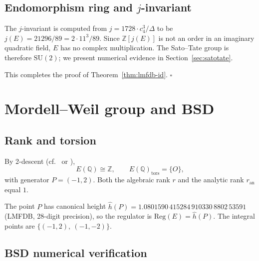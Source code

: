 \documentclass[11pt,a4paper]{article}
\theoremstyle{plain}
\theoremstyle{definition}
\newcommand{\Q}{\mathbb{Q}}
\newcommand{\Z}{\mathbb{Z}}
\newcommand{\Reg}{\mathrm{Reg}}
\begin{document}
\subsection{Endomorphism ring and $j$-invariant}

The $j$-invariant is computed from
$j = 1728 \cdot c_4^3 / \Delta$ to be
$j(E) = 21296 / 89 = 2 \cdot 11^3 / 89$.
Since $\mathbb{Z}[j(E)]$ is not an order in an imaginary quadratic
field, $E$ has no complex multiplication. The Sato--Tate group is
therefore $\mathrm{SU}(2)$; we present numerical evidence in
Section~\ref{sec:satotate}.

This completes the proof of Theorem~\ref{thm:lmfdb-id}. \hfill$\square$

\section{Mordell--Weil group and BSD}
\label{sec:rank-bsd}

\subsection{Rank and torsion}

By 2-descent (cf.\ \cite{Cremona1997} or \cite[Ch.~VIII]{Silverman2009}),
\begin{equation*}
  E(\Q) \cong \Z,
  \qquad E(\Q)_{\mathrm{tors}} = \{O\},
\end{equation*}
with generator $P = (-1, 2)$. Both the algebraic rank $r$ and the
analytic rank $r_{\mathrm{an}}$ equal $1$.

The point $P$ has canonical height
$\hat{h}(P) = 1.0801590\,415284\,910330\,8802\,53591$
(LMFDB, 28-digit precision), so the regulator is
$\Reg(E) = \hat{h}(P)$. The integral points are
$\{(-1, 2),\ (-1, -2)\}$.

\subsection{BSD numerical verification}
\end{document}
